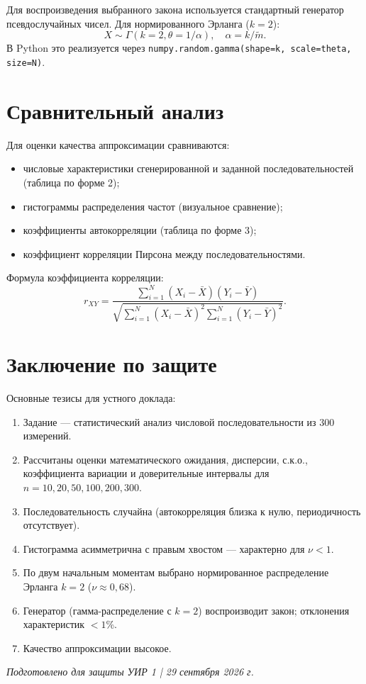 \documentclass[a4paper,12pt]{article}
\begin{document}
Для воспроизведения выбранного закона используется стандартный генератор псевдослучайных чисел.
Для нормированного Эрланга ($k=2$):
\begin{equation}
X \sim \Gamma(k=2, \theta = 1/\alpha), \quad \alpha = k/\tilde{m}.
\end{equation}
В Python это реализуется через \texttt{numpy.random.gamma(shape=k, scale=theta, size=N)}.

\section{Сравнительный анализ}

Для оценки качества аппроксимации сравниваются:
\begin{itemize}
    \item числовые характеристики сгенерированной и заданной последовательностей (таблица по форме 2);
    \item гистограммы распределения частот (визуальное сравнение);
    \item коэффициенты автокорреляции (таблица по форме 3);
    \item коэффициент корреляции Пирсона между последовательностями.
\end{itemize}

Формула коэффициента корреляции:
\begin{equation}\label{eq:corr}
r_{XY} = \frac{\sum_{i=1}^{N}(X_i - \bar{X})(Y_i - \bar{Y})}{\sqrt{\sum_{i=1}^{N}(X_i - \bar{X})^2 \sum_{i=1}^{N}(Y_i - \bar{Y})^2}}.
\end{equation}

\section{Заключение по защите}

Основные тезисы для устного доклада:
\begin{enumerate}
    \item Задание — статистический анализ числовой последовательности из 300 измерений.
    \item Рассчитаны оценки математического ожидания, дисперсии, с.к.о., коэффициента вариации и доверительные интервалы для $n=10,20,50,100,200,300$.
    \item Последовательность случайна (автокорреляция близка к нулю, периодичность отсутствует).
    \item Гистограмма асимметрична с правым хвостом — характерно для $\nu < 1$.
    \item По двум начальным моментам выбрано нормированное распределение Эрланга $k=2$ ($\nu \approx 0{,}68$).
    \item Генератор (гамма-распределение с $k=2$) воспроизводит закон; отклонения характеристик $<1$\%.
    \item Качество аппроксимации высокое.
\end{enumerate}

\vfill
\begin{center}
\textit{Подготовлено для защиты УИР 1 | 29 сентября 2026 г.}
\end{center}
\end{document}
